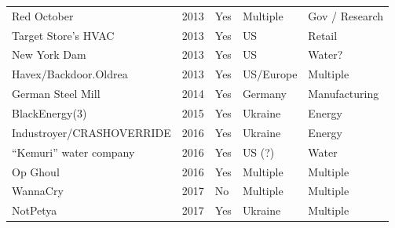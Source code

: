 \documentclass[runningheads]{llncs}
\begin{document}
\begin{table}[]
\begin{tabular}{|l|l|l|l|l|}
    Red October                     & 2013                                       & Yes                                    & Multiple                                     & Gov / Research                       \\
    Target Store's HVAC             & 2013                                       & Yes                                    & US                                           & Retail                               \\
    New York Dam                    & 2013                                       & Yes                                    & US                                           & Water?                               \\
    Havex/Backdoor.Oldrea           & 2013                                       & Yes                                    & US/Europe                                    & Multiple                             \\
    German Steel Mill               & 2014                                       & Yes                                    & Germany                                      & Manufacturing                    \\
    BlackEnergy(3)                  & 2015                                       & Yes                                    & Ukraine                                      & Energy                               \\
    Industroyer/CRASHOVERRIDE       & 2016                                       & Yes                                    & Ukraine                                      & Energy                               \\
    “Kemuri” water company          & 2016                                       & Yes                                    & US (?)                                       & Water                                \\
    Op Ghoul                        & 2016                                       & Yes                                    & Multiple                                     & Multiple                             \\
    WannaCry                        & 2017                                       & No                                     & Multiple                                     & Multiple                             \\
    NotPetya                        & 2017                                       & Yes                                    & Ukraine                              & Multiple                             \\

\end{tabular}
\end{table}
\end{document}
